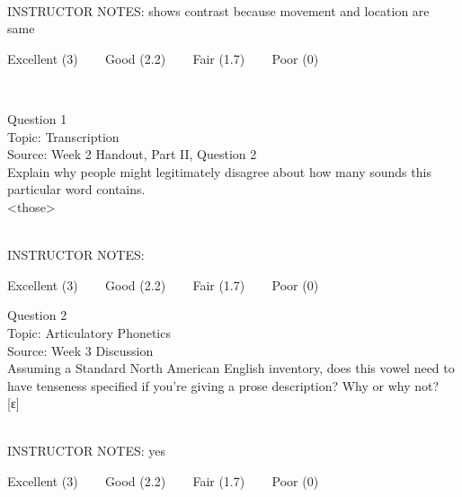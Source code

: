 \documentclass[12pt]{article}
\begin{document}
~\\
INSTRUCTOR NOTES: shows contrast because movement and location are same


\vfill
Excellent (3) ~~~ Good (2.2) ~~~ Fair (1.7) ~~~ Poor (0)
\newpage

\begin{center}
\textbf{{\color{red}{\HUGE END OF EXAM}}}\\

\end{center}
\newpage

\begin{center}
\textbf{{\color{blue}{\HUGE START OF EXAM\\}}}

\textbf{{\color{blue}{\HUGE Student ID: 56567\\}}}

\textbf{{\color{blue}{\HUGE \\}}}

\end{center}
\newpage

{\large Question 1}\\

Topic: Transcription\\
Source: Week 2 Handout, Part II, Question 2\\

Explain why people might legitimately disagree about how many sounds this particular word contains.\\

<those>


~\\
INSTRUCTOR NOTES: 


\vfill
Excellent (3) ~~~ Good (2.2) ~~~ Fair (1.7) ~~~ Poor (0)
\newpage

{\large Question 2}\\

Topic: Articulatory Phonetics\\
Source: Week 3 Discussion\\

Assuming a Standard North American English inventory, does this vowel need to have tenseness specified if you're giving a prose description? Why or why not?\\

{[ɛ]}


~\\
INSTRUCTOR NOTES: yes


\vfill
Excellent (3) ~~~ Good (2.2) ~~~ Fair (1.7) ~~~ Poor (0)
\newpage
\end{document}
